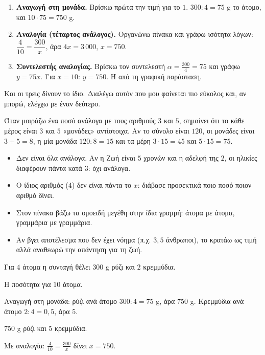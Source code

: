 
\begin{enumerate}[leftmargin=1.6em,itemsep=0.3ex,topsep=2pt]
\item \textbf{Αναγωγή στη μονάδα.} Βρίσκω πρώτα την τιμή για το $1$. $300:4=75$ g το άτομο, και $10\cdot75=750$ g.
\item \textbf{Αναλογία (τέταρτος ανάλογος).} Οργανώνω πίνακα και γράφω ισότητα λόγων: $\dfrac{4}{10}=\dfrac{300}{x}$, άρα $4x=3\,000$, $x=750$.
\item \textbf{Συντελεστής αναλογίας.} Βρίσκω τον συντελεστή $\alpha=\frac{300}{4}=75$ και γράφω $y=75x$. Για $x=10$: $y=750$. Ή από τη γραφική παράσταση.
\end{enumerate}

Και οι τρεις δίνουν το ίδιο. Διαλέγω αυτόν που μου φαίνεται πιο εύκολος και, αν μπορώ, ελέγχω με έναν δεύτερο.


Όταν μοιράζω ένα ποσό ανάλογα με τους αριθμούς $3$ και $5$, σημαίνει ότι το κάθε μέρος είναι $3$ και $5$ «μονάδες» αντίστοιχα. Αν το σύνολο είναι $120$, οι μονάδες είναι $3+5=8$, η μία μονάδα $120:8=15$ και τα μέρη $3\cdot15=45$ και $5\cdot15=75$.

\begin{prosoxi}
\begin{itemize}[leftmargin=1.2em,itemsep=0.3ex,topsep=2pt]
\item Δεν είναι όλα ανάλογα. Αν η Ζωή είναι $5$ χρονών και η αδελφή της $2$, οι ηλικίες διαφέρουν πάντα κατά $3$: όχι ανάλογα.
\item Ο ίδιος αριθμός ($4$) δεν είναι πάντα το $x$: διάβασε προσεκτικά ποιο ποσό ποιον αριθμό δίνει.
\item Στον πίνακα βάζω τα ομοειδή μεγέθη στην ίδια γραμμή: άτομα με άτομα, γραμμάρια με γραμμάρια.
\item Αν βγει αποτέλεσμα που δεν έχει νόημα (π.χ. $3{,}5$ άνθρωποι), το κρατάω ως τιμή αλλά αναθεωρώ την απάντηση για τη ζωή.
\end{itemize}
\end{prosoxi}


\tixero Για $4$ άτομα η συνταγή θέλει $300$ g ρύζι και $2$ κρεμμύδια.\par
\tithelo Η ποσότητα για $10$ άτομα.\par
\possindeo Αναγωγή στη μονάδα: ρύζι ανά άτομο $300:4=75$ g, άρα $750$ g. Κρεμμύδια ανά άτομο $2:4=0{,}5$, άρα $5$.\par
\apantisi $750$ g ρύζι και $5$ κρεμμύδια.\par
\elegxos Με αναλογία: $\frac{4}{10}=\frac{300}{x}$ δίνει $x=750$.

